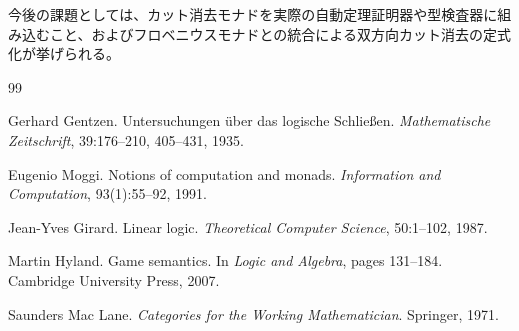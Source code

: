 \documentclass[11pt,a4paper]{article}
\theoremstyle{definition}
\begin{document}
今後の課題としては、カット消去モナドを実際の自動定理証明器や型検査器に組み込むこと、およびフロベニウスモナドとの統合による双方向カット消去の定式化が挙げられる。

\begin{thebibliography}{99}

Gerhard Gentzen.
\newblock Untersuchungen über das logische Schließen.
\newblock \emph{Mathematische Zeitschrift}, 39:176--210, 405--431, 1935.

Eugenio Moggi.
\newblock Notions of computation and monads.
\newblock \emph{Information and Computation}, 93(1):55--92, 1991.

Jean-Yves Girard.
\newblock Linear logic.
\newblock \emph{Theoretical Computer Science}, 50:1--102, 1987.

Martin Hyland.
\newblock Game semantics.
\newblock In \emph{Logic and Algebra}, pages 131--184. Cambridge University Press, 2007.

Saunders Mac Lane.
\newblock \emph{Categories for the Working Mathematician}.
\newblock Springer, 1971.

\end{thebibliography}
\end{document}
